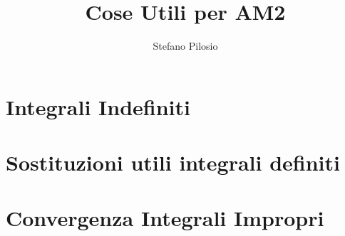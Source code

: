 \documentclass[a4paper]{article}
\begin{document}
\author{Stefano Pilosio}
\title {Cose Utili per AM2}
\maketitle

\section{Integrali Indefiniti}

\section{Sostituzioni utili integrali definiti}

\section{Convergenza Integrali Impropri}
\end{document}
